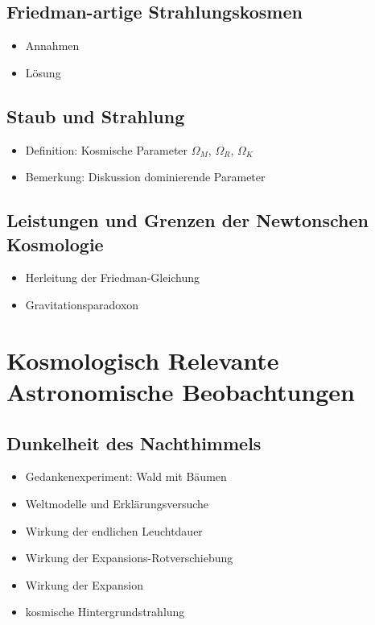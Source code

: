 \documentclass{article}
\begin{document}
\begin{multicols}{2}
    \subsection{Friedman-artige Strahlungskosmen} %
    \label{sub:friedman_artige_strahlungskosmen}
      \begin{itemize}
        \item Annahmen
        \item Lösung
      \end{itemize}

    \subsection{Staub und Strahlung} %
    \label{sub:staub_und_strahlung}
      \begin{itemize}
        \item Definition: Kosmische Parameter $\Omega_M$, $\Omega_R$, $\Omega_K$
        \item Bemerkung: Diskussion dominierende Parameter
      \end{itemize}

    \subsection{Leistungen und Grenzen der Newtonschen Kosmologie} %
    \label{sub:leistungen_und_grenzen_der_newtonschen_kosmologie}
      \begin{itemize}
        \item Herleitung der Friedman-Gleichung
        \item Gravitationsparadoxon
      \end{itemize}

  \section{Kosmologisch Relevante Astronomische Beobachtungen} %
  \label{sec:kosmologisch_relevante_astronomische_beobachtungen}
    \subsection{Dunkelheit des Nachthimmels} %
    \label{sub:dunkelheit_des_nachthimmels}
      \begin{itemize}
        \item Gedankenexperiment: Wald mit Bäumen
        \item Weltmodelle und Erklärungsversuche
        \item Wirkung der endlichen Leuchtdauer
        \item Wirkung der Expansions-Rotverschiebung
        \item Wirkung der Expansion
        \item kosmische Hintergrundstrahlung
      \end{itemize}


\end{multicols}
\end{document}
